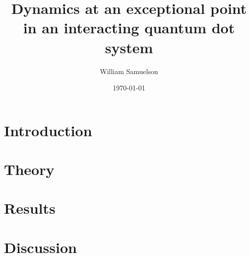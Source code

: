 \documentclass{article}
\begin{document}
%
\title{Dynamics at an exceptional point in an interacting quantum dot system}
\author{William Samuelson}
\date{\today}
\maketitle
\newpage
\section{Introduction}

\section{Theory}

\section{Results}

\section{Discussion}


\newpage
\printbibliography
\end{document}
